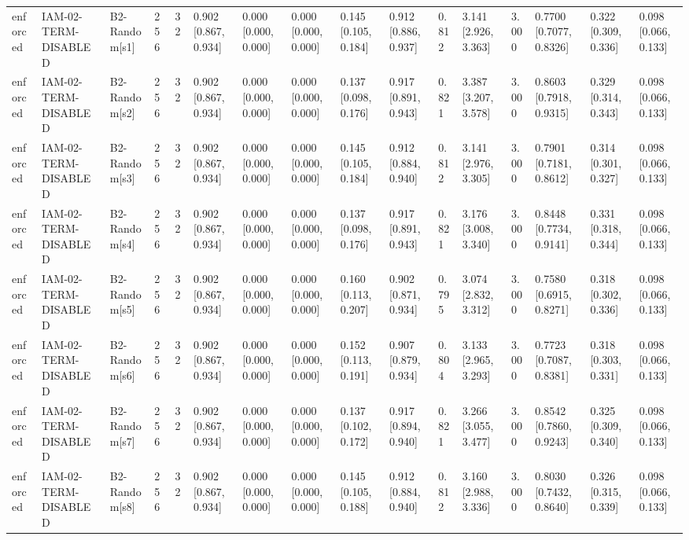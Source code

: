 \begin{table}[!ht]
{\begin{tabular}{llllllllllllllll}
enforced & IAM-02-TERM-DISABLED & B2-Random[s1] & 256 & 32 & 0.902 [0.867, 0.934] & 0.000 [0.000, 0.000] & 0.000 [0.000, 0.000] & 0.145 [0.105, 0.184] & 0.912 [0.886, 0.937] & 0.812 & 3.141 [2.926, 3.363] & 3.000 & 0.7700 [0.7077, 0.8326] & 0.322 [0.309, 0.336] & 0.098 [0.066, 0.133] \\
enforced & IAM-02-TERM-DISABLED & B2-Random[s2] & 256 & 32 & 0.902 [0.867, 0.934] & 0.000 [0.000, 0.000] & 0.000 [0.000, 0.000] & 0.137 [0.098, 0.176] & 0.917 [0.891, 0.943] & 0.821 & 3.387 [3.207, 3.578] & 3.000 & 0.8603 [0.7918, 0.9315] & 0.329 [0.314, 0.343] & 0.098 [0.066, 0.133] \\
enforced & IAM-02-TERM-DISABLED & B2-Random[s3] & 256 & 32 & 0.902 [0.867, 0.934] & 0.000 [0.000, 0.000] & 0.000 [0.000, 0.000] & 0.145 [0.105, 0.184] & 0.912 [0.884, 0.940] & 0.812 & 3.141 [2.976, 3.305] & 3.000 & 0.7901 [0.7181, 0.8612] & 0.314 [0.301, 0.327] & 0.098 [0.066, 0.133] \\
enforced & IAM-02-TERM-DISABLED & B2-Random[s4] & 256 & 32 & 0.902 [0.867, 0.934] & 0.000 [0.000, 0.000] & 0.000 [0.000, 0.000] & 0.137 [0.098, 0.176] & 0.917 [0.891, 0.943] & 0.821 & 3.176 [3.008, 3.340] & 3.000 & 0.8448 [0.7734, 0.9141] & 0.331 [0.318, 0.344] & 0.098 [0.066, 0.133] \\
enforced & IAM-02-TERM-DISABLED & B2-Random[s5] & 256 & 32 & 0.902 [0.867, 0.934] & 0.000 [0.000, 0.000] & 0.000 [0.000, 0.000] & 0.160 [0.113, 0.207] & 0.902 [0.871, 0.934] & 0.795 & 3.074 [2.832, 3.312] & 3.000 & 0.7580 [0.6915, 0.8271] & 0.318 [0.302, 0.336] & 0.098 [0.066, 0.133] \\
enforced & IAM-02-TERM-DISABLED & B2-Random[s6] & 256 & 32 & 0.902 [0.867, 0.934] & 0.000 [0.000, 0.000] & 0.000 [0.000, 0.000] & 0.152 [0.113, 0.191] & 0.907 [0.879, 0.934] & 0.804 & 3.133 [2.965, 3.293] & 3.000 & 0.7723 [0.7087, 0.8381] & 0.318 [0.303, 0.331] & 0.098 [0.066, 0.133] \\
enforced & IAM-02-TERM-DISABLED & B2-Random[s7] & 256 & 32 & 0.902 [0.867, 0.934] & 0.000 [0.000, 0.000] & 0.000 [0.000, 0.000] & 0.137 [0.102, 0.172] & 0.917 [0.894, 0.940] & 0.821 & 3.266 [3.055, 3.477] & 3.000 & 0.8542 [0.7860, 0.9243] & 0.325 [0.309, 0.340] & 0.098 [0.066, 0.133] \\
enforced & IAM-02-TERM-DISABLED & B2-Random[s8] & 256 & 32 & 0.902 [0.867, 0.934] & 0.000 [0.000, 0.000] & 0.000 [0.000, 0.000] & 0.145 [0.105, 0.188] & 0.912 [0.884, 0.940] & 0.812 & 3.160 [2.988, 3.336] & 3.000 & 0.8030 [0.7432, 0.8640] & 0.326 [0.315, 0.339] & 0.098 [0.066, 0.133] \\

\end{tabular}}
\end{table}
